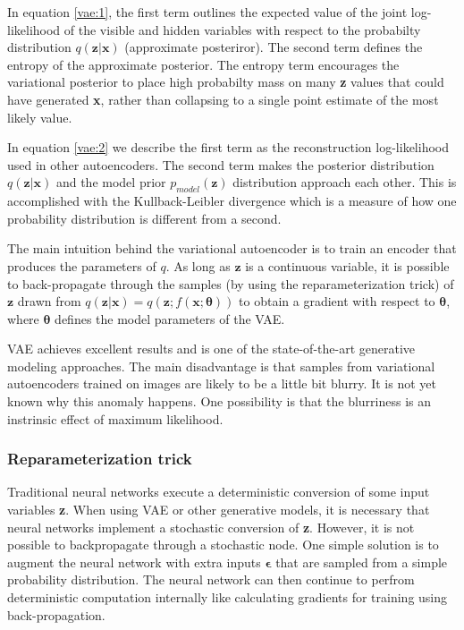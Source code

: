 In equation \ref{vae:1}, the first term outlines the expected value of the joint
log-likelihood of the visible and hidden variables with respect to the
probabilty distribution $q(\textbf{z}|\textbf{x})$ (approximate posteriror). The
second term defines the entropy of the approximate posterior. The entropy term
encourages the variational posterior to place high probabilty mass on many
\textbf{z} values that could have generated \textbf{x}, rather than collapsing
to a single point estimate of the most likely value.

In equation \ref{vae:2} we describe the first term as the reconstruction
log-likelihood used in other autoencoders. The second term makes the posterior
distribution $q(\textbf{z}|\textbf{x})$ and the model prior
$p_{model}(\textbf{z})$ distribution approach each other. This is accomplished with the
Kullback-Leibler divergence which is a measure of how one probability
distribution is different from a second.

The main intuition behind the variational autoencoder is to train an encoder that
produces the parameters of $q$. As long as $\textbf{z}$ is a continuous
variable, it is possible to back-propagate through the samples (by using the
reparameterization trick) of $\textbf{z}$ drawn from $q(\textbf{z}|\textbf{x}) =
q(\textbf{z};f(\textbf{x};\boldsymbol\theta))$ to obtain a gradient with respect
to $\boldsymbol\theta$, where $\boldsymbol\theta$ defines the model parameters
of the VAE.

VAE achieves excellent results and is one of the state-of-the-art generative
modeling approaches. The main disadvantage is that samples from variational
autoencoders trained on images are likely to be a little bit blurry. It is not
yet known why this anomaly happens. One possibility is that the blurriness is an
instrinsic effect of maximum likelihood.

\subsubsection{Reparameterization trick}
Traditional neural networks execute a deterministic conversion of some input
variables \textbf{z}. When using VAE or other generative models, it is necessary
that neural networks implement a stochastic conversion of \textbf{z}.
However, it is not possible to backpropagate through a stochastic node. One
simple solution is to augment the neural network with extra inputs
$\boldsymbol\epsilon$ that are sampled from a simple probability distribution.
The neural network can then continue to perfrom deterministic computation
internally like calculating gradients for training using back-propagation.

